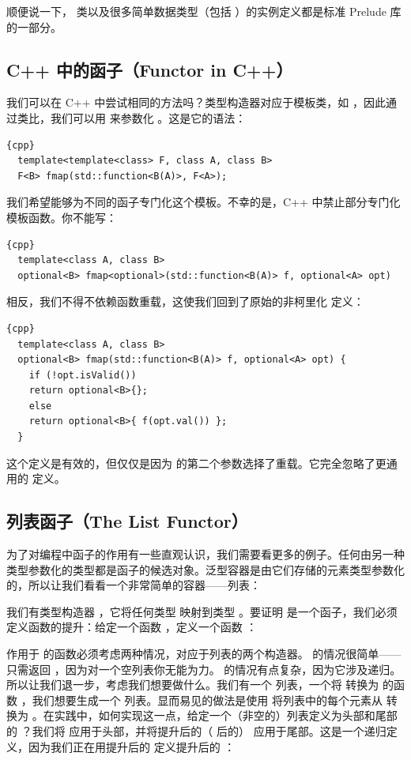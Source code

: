 顺便说一下， 类以及很多简单数据类型（包括 ）的实例定义都是标准 Prelude 库的一部分。

\subsection{C++ 中的函子（Functor in C++）}

我们可以在 C++ 中尝试相同的方法吗？类型构造器对应于模板类，如 ，因此通过类比，我们可以用  来参数化 。这是它的语法：

\begin{lstlisting}{cpp}
  template<template<class> F, class A, class B>
  F<B> fmap(std::function<B(A)>, F<A>);
\end{lstlisting}
我们希望能够为不同的函子专门化这个模板。不幸的是，C++ 中禁止部分专门化模板函数。你不能写：

\begin{lstlisting}{cpp}
  template<class A, class B>
  optional<B> fmap<optional>(std::function<B(A)> f, optional<A> opt)
\end{lstlisting}
相反，我们不得不依赖函数重载，这使我们回到了原始的非柯里化  定义：

\begin{lstlisting}{cpp}
  template<class A, class B>
  optional<B> fmap(std::function<B(A)> f, optional<A> opt) {
    if (!opt.isValid())
    return optional<B>{};
    else
    return optional<B>{ f(opt.val()) };
  }
\end{lstlisting}
这个定义是有效的，但仅仅是因为  的第二个参数选择了重载。它完全忽略了更通用的  定义。

\subsection{列表函子（The List Functor）}

为了对编程中函子的作用有一些直观认识，我们需要看更多的例子。任何由另一种类型参数化的类型都是函子的候选对象。泛型容器是由它们存储的元素类型参数化的，所以让我们看看一个非常简单的容器——列表：

我们有类型构造器 ，它将任何类型  映射到类型 。要证明  是一个函子，我们必须定义函数的提升：给定一个函数 ，定义一个函数 ：

作用于  的函数必须考虑两种情况，对应于列表的两个构造器。 的情况很简单——只需返回 ，因为对一个空列表你无能为力。 的情况有点复杂，因为它涉及递归。所以让我们退一步，考虑我们想要做什么。我们有一个  列表，一个将  转换为  的函数 ，我们想要生成一个  列表。显而易见的做法是使用  将列表中的每个元素从  转换为 。在实践中，如何实现这一点，给定一个（非空的）列表定义为头部和尾部的 ？我们将  应用于头部，并将提升后的（ 后的） 应用于尾部。这是一个递归定义，因为我们正在用提升后的  定义提升后的 ：

